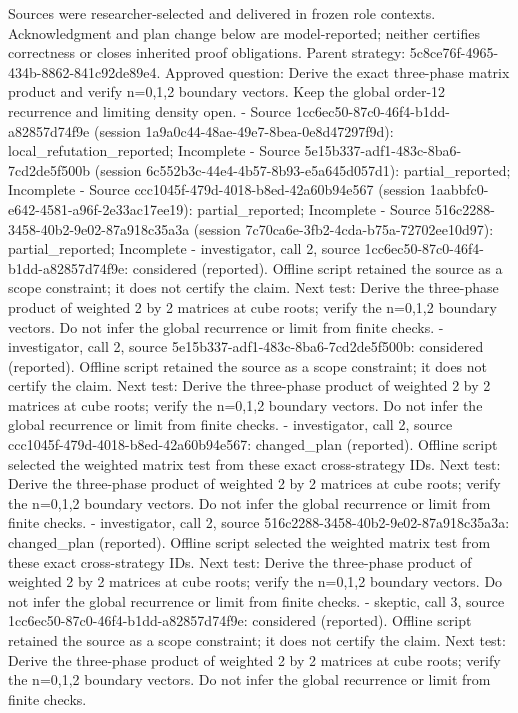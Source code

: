 \documentclass[11pt]{article}
\begin{document}
Sources were researcher-selected and delivered in frozen role contexts. Acknowledgment and plan change below are model-reported; neither certifies correctness or closes inherited proof obligations.
Parent strategy: 5c8ce76f-4965-434b-8862-841c92de89e4. Approved question: Derive the exact three-phase matrix product and verify n=0,1,2 boundary vectors. Keep the global order-12 recurrence and limiting density open.
- Source 1cc6ec50-87c0-46f4-b1dd-a82857d74f9e (session 1a9a0c44-48ae-49e7-8bea-0e8d47297f9d): local\_refutation\_reported; Incomplete
- Source 5e15b337-adf1-483c-8ba6-7cd2de5f500b (session 6c552b3c-44e4-4b57-8b93-e5a645d057d1): partial\_reported; Incomplete
- Source ccc1045f-479d-4018-b8ed-42a60b94e567 (session 1aabbfc0-e642-4581-a96f-2e33ac17ee19): partial\_reported; Incomplete
- Source 516c2288-3458-40b2-9e02-87a918c35a3a (session 7c70ca6e-3fb2-4cda-b75a-72702ee10d97): partial\_reported; Incomplete
- investigator, call 2, source 1cc6ec50-87c0-46f4-b1dd-a82857d74f9e: considered (reported). Offline script retained the source as a scope constraint; it does not certify the claim. Next test: Derive the three-phase product of weighted 2 by 2 matrices at cube roots; verify the n=0,1,2 boundary vectors. Do not infer the global recurrence or limit from finite checks.
- investigator, call 2, source 5e15b337-adf1-483c-8ba6-7cd2de5f500b: considered (reported). Offline script retained the source as a scope constraint; it does not certify the claim. Next test: Derive the three-phase product of weighted 2 by 2 matrices at cube roots; verify the n=0,1,2 boundary vectors. Do not infer the global recurrence or limit from finite checks.
- investigator, call 2, source ccc1045f-479d-4018-b8ed-42a60b94e567: changed\_plan (reported). Offline script selected the weighted matrix test from these exact cross-strategy IDs. Next test: Derive the three-phase product of weighted 2 by 2 matrices at cube roots; verify the n=0,1,2 boundary vectors. Do not infer the global recurrence or limit from finite checks.
- investigator, call 2, source 516c2288-3458-40b2-9e02-87a918c35a3a: changed\_plan (reported). Offline script selected the weighted matrix test from these exact cross-strategy IDs. Next test: Derive the three-phase product of weighted 2 by 2 matrices at cube roots; verify the n=0,1,2 boundary vectors. Do not infer the global recurrence or limit from finite checks.
- skeptic, call 3, source 1cc6ec50-87c0-46f4-b1dd-a82857d74f9e: considered (reported). Offline script retained the source as a scope constraint; it does not certify the claim. Next test: Derive the three-phase product of weighted 2 by 2 matrices at cube roots; verify the n=0,1,2 boundary vectors. Do not infer the global recurrence or limit from finite checks.
\end{document}
